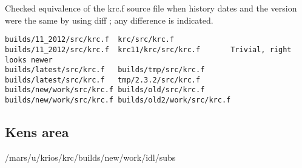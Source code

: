 \documentclass{article}
\begin{document}
Checked equivalence of the krc.f source file when history dates and the version
were the same by using diff ; any difference is indicated.
\vspace{-3.mm} 
\begin{verbatim}
builds/11_2012/src/krc.f  krc/src/krc.f     
builds/11_2012/src/krc.f  krc11/krc/src/krc.f       Trivial, right looks newer
builds/latest/src/krc.f   builds/tmp/src/krc.f
builds/latest/src/krc.f   tmp/2.3.2/src/krc.f
builds/new/work/src/krc.f builds/old/src/krc.f
builds/new/work/src/krc.f builds/old2/work/src/krc.f
\end{verbatim} 

\subsection{Kens area}
/mars/u/krios/krc/builds/new/work/idl/subs
\end{document}
